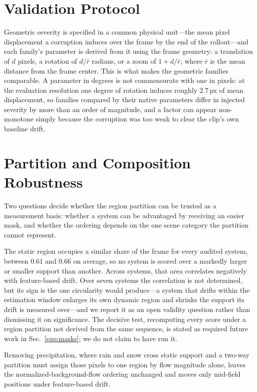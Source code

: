 \documentclass[10pt,twocolumn,letterpaper]{article}
\begin{document}
\section{Validation Protocol}
\label{sup:validation}

Geometric severity is specified in a common physical unit---the mean pixel
displacement a corruption induces over the frame by the end of the
rollout---and each family's parameter is derived from it using the frame
geometry: a translation of $d$ pixels, a rotation of $d/\bar{r}$ radians, or a
zoom of $1 + d/\bar{r}$, where $\bar{r}$ is the mean distance from the frame
center. This is what makes the geometric families comparable. A parameter in
degrees is not commensurate with one in pixels: at the evaluation resolution one
degree of rotation induces roughly $2.7$\,px of mean displacement, so families
compared by their native parameters differ in injected severity by more than an
order of magnitude, and a factor can appear non-monotone simply because the
corruption was too weak to clear the clip's own baseline drift.



\section{Partition and Composition Robustness}
\label{sup:robustness}

Two questions decide whether the region partition can be trusted as a
measurement basis: whether a system can be advantaged by receiving an easier
mask, and whether the ordering depends on the one scene category the partition
cannot represent.

The static region occupies a similar share of the frame for every audited
system, between $0.61$ and $0.66$ on average, so no system is scored over a
markedly larger or smaller support than another. Across systems, that area
correlates negatively with feature-based drift. Over seven systems the
correlation is not determined, but its sign is the one circularity would
produce---a system that drifts within the estimation window enlarges its own
dynamic region and shrinks the support its drift is measured over---and we
report it as an open validity question rather than dismissing it on
significance. The decisive test, recomputing every score under a region
partition not derived from the same sequence, is stated as required future work
in Sec.~\ref{sup:masks}; we do not claim to have run it.

Removing precipitation, where rain and snow cross static support and a two-way
partition must assign those pixels to one region by flow magnitude alone, leaves
the normalized-background-flow ordering unchanged and moves only mid-field
positions under feature-based drift.
\end{document}
